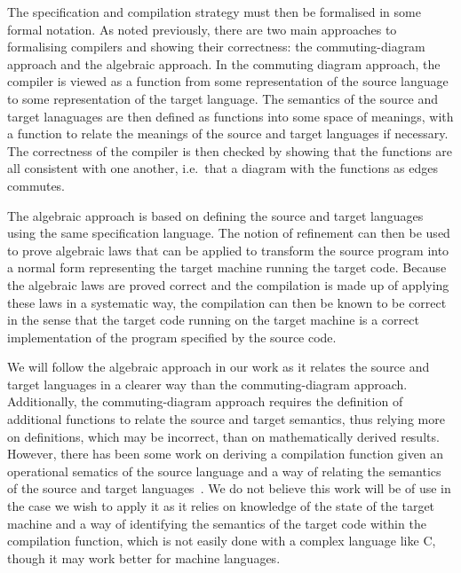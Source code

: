 \documentclass[a4paper,10pt]{report}
\begin{document}
The specification and compilation strategy must then be formalised in
some formal notation.
As noted previously, there are two main approaches to formalising
compilers and showing their correctness: the commuting-diagram
approach and the algebraic approach.
In the commuting diagram approach, the compiler is viewed as a
function from some representation of the source language to some
representation of the target language.
The semantics of the source and target lanaguages are then defined as
functions into some space of meanings, with a function to relate the
meanings of the source and target languages if necessary.
The correctness of the compiler is then checked by showing that the
functions are all consistent with one another, i.e.\ that a diagram
with the functions as edges commutes.

The algebraic approach is based on defining the source and target
languages using the same specification language.
The notion of refinement can then be used to prove algebraic laws
that can be applied to transform the source program into a normal form
representing the target machine running the target code.
Because the algebraic laws are proved correct and the compilation is
made up of applying these laws in a systematic way, the compilation
can then be known to be correct in the sense that the target code
running on the target machine is a correct implementation of the
program specified by the source code.

We will follow the algebraic approach in our work as it relates the
source and target languages in a clearer way than the
commuting-diagram approach.
Additionally, the commuting-diagram approach requires the definition
of additional functions to relate the source and target semantics,
thus relying more on definitions, which may be incorrect, than on
mathematically derived results.
However, there has been some work on deriving a compilation function
given an operational sematics of the source language and a way of
relating the semantics of the source and target
languages~\cite{bahr2015}.
We do not believe this work will be of use in the case we wish to
apply it as it relies on knowledge of the state of the target machine
and a way of identifying the semantics of the target code within the
compilation function, which is not easily done with a complex language
like C, though it may work better for machine languages.
\end{document}
